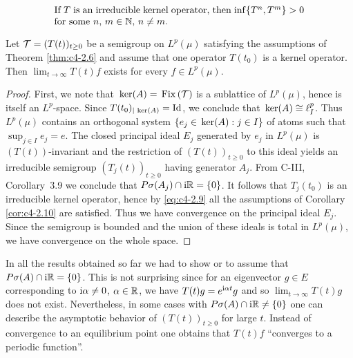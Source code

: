 \begin{equation}\label{eq:c4-2.9}
\begin{minipage}{.75\textwidth}
If $T$ is an irreducible kernel operator, then 
$\inf\{T^{n},T^{m}\} > 0$ for some  $n$, $m \in \N$, $n \neq m$.
\end{minipage}
\end{equation}
\begin{corollary}\label{cor:c4-2.11}
%
%
%
Let $\mathcal{T} = (T(t))_{t\geq 0}$ be a semigroup on $L^{p}(\mu)$ satisfying the assumptions of Theorem \ref{thm:c4-2.6} and assume that one operator $T(t_{0})$ is a kernel operator.
Then $\lim_{t \to \infty}T(t)f$ exists for every $f \in L^{p}(\mu)$.
\end{corollary}
\begin{proof}
First, we note that $\mathop{}\mathrm{ker}(A) = \mathop{}\mathrm{Fix}\left(\mathcal{T}\right)$ is a sublattice of $L^{p}(\mu)$, hence is itself an $L^{p}$-space.
Since $T(t_{0})_{|\mathop{}\mathrm{ker}(A)} = \operatorname{Id}$, we conclude that $\mathop{}\mathrm{ker}(A) \cong \ell^{p}_{I}$.
Thus $L^{p}(\mu)$ contains an orthogonal system $\{e_{j} \in \mathop{}\mathrm{ker}(A): j \in I\}$ of atoms such that $\sup_{j\in I}e_{j} = e$.
The closed principal ideal $E_{j}$ generated by $e_{j}$ in $L^{p}(\mu)$ is $(T(t))$-invariant and the restriction of $(T(t))_{t \geq 0}$ to this ideal yields an irreducible semigroup $(T_{j}(t))_{t \geq 0}$ having generator $A_{j}$.
From C-III, Corollary~3.9
we conclude that $P{\sigma}(A_{j})\cap \mathrm{i}\mathbb{R} = \{0\}$.
It follows that $T_{j}(t_{0})$ is an irreducible kernel operator, hence by \eqref{eq:c4-2.9} all the assumptions of Corollary \ref{cor:c4-2.10} are satisfied.
Thus we have convergence on the principal ideal $E_{j}$.
Since the semigroup is bounded and the union of these ideals is total in $L^{p}(\mu)$, we have convergence on the whole space.
\end{proof}
In all the results obtained so far we had to show or to assume that $P{\sigma}(A) \cap \mathrm{i}\mathbb{R} = \{0\}$.
This is not surprising since for an eigenvector $g \in E$ corresponding to $\mathrm{i}\alpha \neq 0$, $\alpha \in \mathbb{R}$, we have $T(t)g = e^{\mathrm{i}\alpha t}g$ and so $\lim_{t\to\infty} T(t)g$ does not exist.
Nevertheless, in some cases with $P{\sigma}(A)\cap \mathrm{i}\mathbb{R} \neq \{0\}$ one can describe the asymptotic behavior of $(T(t))_{t \geq 0}$ for large $t$.
Instead of convergence to an equilibrium point one obtains that $T(t)f$  \enquote{converges to a periodic function}.


